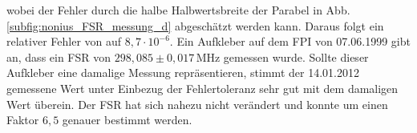 wobei der Fehler durch die halbe Halbwertsbreite der Parabel in Abb.
\ref{subfig:nonius_FSR_messung_d} abgeschätzt werden kann. Daraus folgt ein
relativer Fehler von auf $8,7\cdot10^{-6}$. Ein Aufkleber auf dem FPI von
07.06.1999 gibt an, dass ein FSR von $298,085\pm0,017\,$MHz gemessen wurde.
Sollte dieser Aufkleber eine damalige Messung repräsentieren, stimmt der
14.01.2012 gemessene Wert unter Einbezug der Fehlertoleranz sehr gut mit dem
damaligen Wert überein. Der FSR hat sich nahezu nicht verändert und konnte um
einen Faktor $6,5$ genauer bestimmt werden.
\begin{figure}[H]
 	\centering
\end{figure}
